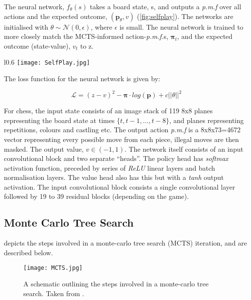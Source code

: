 \documentclass[../main.tex]{subfiles}
\begin{document}
The neural network, $f_\theta(s)$ takes a board state, s, and outputs a \textit{p.m.f} over all actions and the expected outcome, $(\boldsymbol{p}_\theta, v)$ (\cref{fig:selfplay}). The networks are initialised with $\theta \sim \mathcal{N}(0, \epsilon)$, where $\epsilon$ is small. The neural network is trained to more closely match the MCTS-informed action-\textit{p.m.f.}s, $\boldsymbol{\pi}_t$, and the expected outcome (state-value), $v_t$ to z.

\begin{wrapfigure}{l}{0.6\textwidth}
   \centering
   \texttt{[image: SelfPlay.jpg]}
   \caption{A schematic showing how self-play and policy training are performed. Taken from \cite{AlphaGoZero}.}
   \label{fig:selfplay}
   \vspace{0.5cm}
\end{wrapfigure}

The loss function for the neural network is given by:

\begin{equation}
    \mathcal{L} = (z - v)^2 - \boldsymbol{\pi} \cdot log(\boldsymbol{p}) + c||\theta||^2
   \label{eqn:loss}
\end{equation}

For chess, the input state consists of an image stack of 119 8x8 planes representing the board state at times $ \{ t, t-1, ..., t-8 \} $, and planes representing repetitions, colours and castling etc. The output action \textit{p.m.f} is a 8x8x73=4672 vector representing every possible move from each piece, illegal moves are then masked. The output value, $v \in (-1, 1)$. 
The network itself consists of an input convolutional block and two separate ``heads''. The policy head has \textit{softmax} activation function, preceded by series of \textit{ReLU} linear layers and batch normalisation layers. The value head also has this but with a \textit{tanh} output activation. The input convolutional block consists a single convolutional layer followed by 19 to 39 residual blocks (depending on the game).

\subsection{Monte Carlo Tree Search}
\label{sec:mctsintro}
 depicts the steps involved in a monte-carlo tree search (MCTS) iteration, and are described below.

\begin{figure}[H]
   \centering
   \texttt{[image: MCTS.jpg]}
   \caption{\label{fig:MCTS} A schematic outlining the steps involved in a monte-carlo tree search. Taken from \cite{AlphaGoZero}.}
\end{figure}
\end{document}

